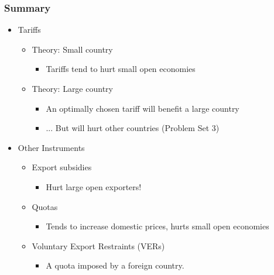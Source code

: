 \documentclass{beamer}
\begin{document}
\begin{frame}
	\frametitle{Summary}
	\begin{itemize}
		\item Tariffs
		\begin{itemize}
			\item Theory: Small country
				\begin{itemize}
					\item Tariffs tend to hurt small open economies
				\end{itemize}
			\item Theory: Large country
				\begin{itemize}
				\item An optimally chosen tariff will benefit a large country
				\item ... But will hurt other countries (Problem Set 3)
				\end{itemize}
		\end{itemize}
		\item Other Instruments
		\begin{itemize}
			\item Export subsidies
				\begin{itemize}
					\item Hurt large open exporters!
				\end{itemize}
			\item Quotas
				\begin{itemize}
					\item Tends to increase domestic prices, hurts small open economies
				\end{itemize}
			\item Voluntary Export Restraints (VERs)
				\begin{itemize}
					\item A quota imposed by a foreign country.
				\end{itemize}
		\end{itemize}
	\end{itemize}
	
\end{frame}
\end{document}
